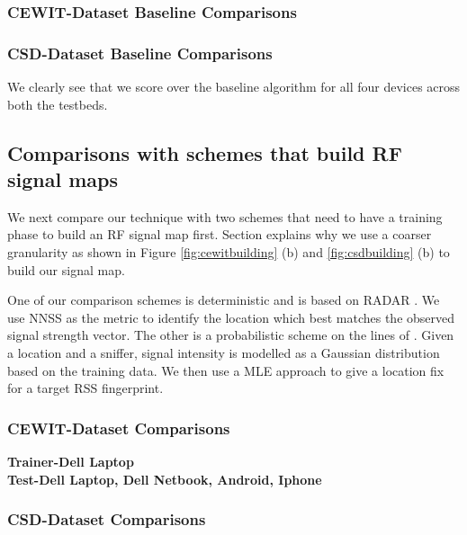 \documentclass{Localization-PaperWriteupDraft}
\begin{document}
\subsubsection{CEWIT-Dataset Baseline Comparisons}
\label{subsubsec:cewitdatasetbaselinecomparisons}

\subsubsection{CSD-Dataset Baseline Comparisons}
\label{subsubsec:csddatasetbaselinecomparisons}


We clearly see that we score over the baseline algorithm for all four
devices across both the testbeds.

\subsection{Comparisons with schemes that build RF signal maps}
\label{subsec:comparisonswithschemesthatbuildrfsignalmaps}

We next compare our technique with two schemes that need to have a
training phase to build an RF signal map first. Section
\label{sec:testbeddetails} explains why we use a coarser
granularity as shown in Figure \ref{fig:cewitbuilding} (b) and
\ref{fig:csdbuilding} (b) to build our signal map.

One of our comparison schemes is deterministic and is based on RADAR
\cite{Bahl00radar:an}. We use NNSS as the metric to identify the location
which best matches the observed signal strength vector. The other is a
probabilistic scheme on the lines of \cite{Haeberlen:2004:PRL:1023720.1023728}. Given a
location and a sniffer, signal intensity is modelled as a Gaussian
distribution based on the training data. We then use a MLE approach to
give a location fix for a target RSS fingerprint.

\subsubsection{CEWIT-Dataset Comparisons}
\label{subsubsec:cewitdatasetcomparisons}

{\bf {Trainer-Dell Laptop \\
			Test-Dell Laptop, Dell Netbook, Android, Iphone}}


\subsubsection{CSD-Dataset Comparisons}
\label{subsubsec:csddatasetcomparisons}
\end{document}
